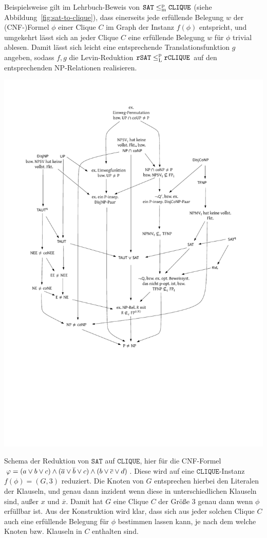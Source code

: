Beispielsweise gilt im Lehrbuch-Beweis von $\mathtt{SAT}\leqmp \mathtt{CLIQUE}$ (siehe Abbildung~\ref{fig:sat-to-clique}), dass einerseits jede erfüllende Belegung $w$ der (CNF-)Formel $\phi$ einer Clique $C$ im Graph der Instanz $f(\phi)$ entspricht, und umgekehrt lässt sich an jeder Clique $C$ eine erfüllende Belegung $w$ für $\phi$ trivial ablesen. Damit lässt sich leicht eine entsprechende Translationsfunktion $g$ angeben, sodass $f,g$ die Levin-Reduktion $\mathtt{rSAT}\leqlp\mathtt{rCLIQUE}$ auf den entsprechenden NP-Relationen realisieren. 

\begin{marginfigure}[1cm]
    \centering\includegraphics[page=12]{figures.pdf}
\caption{Schema der Reduktion von $\mathtt{SAT}$ auf $\mathtt{CLIQUE}$, hier für die CNF-Formel $\smash{\phi=(a\lor b\lor c) \land (\overline{a} \lor\overline{b}\lor c)} \land \smash{(b\lor\overline{c} \lor d)}$. Diese wird auf eine $\mathtt{CLIQUE}$-Instanz $f(\phi)=(G, 3)$ reduziert. Die Knoten von $G$ entsprechen hierbei den Literalen der Klauseln, und genau dann inzident wenn diese in unterschiedlichen Klauseln sind, außer $x$ und $\overline{x}$. Damit hat $G$ eine Clique $C$ der Größe 3 genau dann wenn $\phi$ erfüllbar ist. Aus der Konstruktion wird klar, dass sich aus jeder solchen Clique $C$ auch eine erfüllende Belegung für $\phi$ bestimmen lassen kann, je nach dem welche Knoten bzw. Klauseln in $C$ enthalten sind.}\label{fig:sat-to-clique}
\end{marginfigure}



